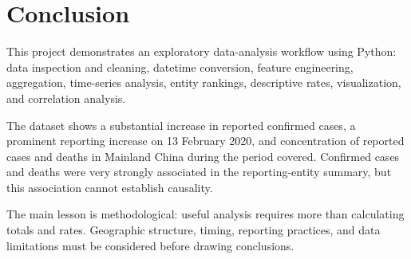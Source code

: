 \documentclass[11pt,a4paper]{article}
\begin{document}
\section{Conclusion}
This project demonstrates an exploratory data-analysis workflow using Python: data inspection and cleaning, datetime conversion, feature engineering, aggregation, time-series analysis, entity rankings, descriptive rates, visualization, and correlation analysis.

The dataset shows a substantial increase in reported confirmed cases, a prominent reporting increase on 13 February 2020, and concentration of reported cases and deaths in Mainland China during the period covered. Confirmed cases and deaths were very strongly associated in the reporting-entity summary, but this association cannot establish causality.

The main lesson is methodological: useful analysis requires more than calculating totals and rates. Geographic structure, timing, reporting practices, and data limitations must be considered before drawing conclusions.
\end{document}
